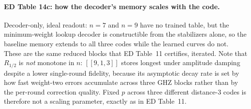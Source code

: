 \documentclass[10pt,a4paper]{article}
\begin{document}
\paragraph*{ED Table 14c: how the decoder's memory scales with the code.}
Decoder-only, ideal readout: $n=7$ and $n=9$ have no trained table, but the
minimum-weight lookup decoder is constructible from the stabilizers alone, so the
baseline memory extends to all three codes while the learned curves do not.  These
are the same reduced blocks that ED Table~11 certifies, iterated.  Note that
$R_{1/2}$ is \emph{not} monotone in $n$: $[\![9,1,3]\!]$ stores longest under
amplitude damping despite a lower single-round fidelity, because its asymptotic
decay rate is set by how fast weight-two errors accumulate across three GHZ
blocks rather than by the per-round correction quality.  Fixed $p$ across three
different distance-$3$ codes is therefore not a scaling parameter, exactly as in
ED Table~11.
\end{document}
